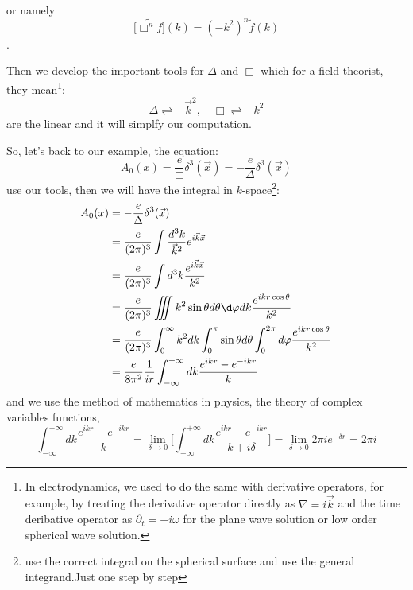\documentclass[12pt,openany]{book}
\begin{document}
	or namely
	\begin{equation}
		\widetilde{\big[\Box^n f\big]}(k)=(-k^2)^n\widetilde{f}(k)
	\end{equation}.\par 
	Then we develop the important tools for $\Delta$ and $\Box$ which for a field theorist, they mean\footnote{In electrodynamics, we used to do the same with derivative operators, for example, by treating the derivative operator directly as $\nabla=i\vec{k}$ and the time deribative operator as $\partial_t=-i\omega$ for the plane wave solution or low order spherical wave solution. }:
	\begin{equation}
		\Delta\rightleftharpoons-\vec{k}^2,\quad \Box\rightleftharpoons-k^2
	\end{equation}
	are the linear and it will simplfy our computation.\par 
	So, let's back to our example, the equation:
	\begin{equation}
		A_0(x)=\frac{e}{\Box}\delta^3(\vec{x})=-\frac{e}{\Delta}\delta^3(\vec{x})
	\end{equation}
	use our tools, then we will have the integral in $k$-space\footnote{use the correct integral on the spherical surface and use the general integrand.Just one step by step}:
	\begin{equation}
		\begin{aligned}
			A_0(x)&=-\frac{e}{\Delta}\delta^3(\vec{x})\\
			&=\frac{e}{(2\pi)^3}\int\frac{d^3k}{\vec{k}^2}e^{i\vec{k}\vec{x}}\\
			&=\frac{e}{(2\pi)^3}\int d^3k\frac{e^{i\vec{k}\vec{x}}}{k^2}\\
			&=\frac{e}{(2\pi)^3}\iiint k^2\sin\theta d\theta\d\varphi dk \frac{e^{ikr\cos\theta}}{k^2}\\
			&=\frac{e}{(2\pi)^3}\int_{0}^{\infty}k^2dk\int_{0}^{\pi}\sin\theta d\theta\int_{0}^{2\pi}d\varphi\frac{e^{ikr\cos\theta}}{k^2}\\
			&=\frac{e}{8\pi^2}\frac{1}{ir}\int_{-\infty}^{+\infty}dk\frac{e^{ikr}-e^{-ikr}}{k}
		\end{aligned}
	\end{equation}
	and we use the method of mathematics in physics, the theory of complex variables functions,
	\begin{equation}
		\int_{-\infty}^{+\infty}dk\frac{e^{ikr}-e^{-ikr}}{k}=\lim\limits_{\delta\rightarrow0}\big[\int_{-\infty}^{+\infty}dk\frac{e^{ikr}-e^{-ikr}}{k+i\delta}\big]=\lim\limits_{\delta\rightarrow0}2\pi ie^{-\delta r}=2\pi i
	\end{equation}
\end{document}

